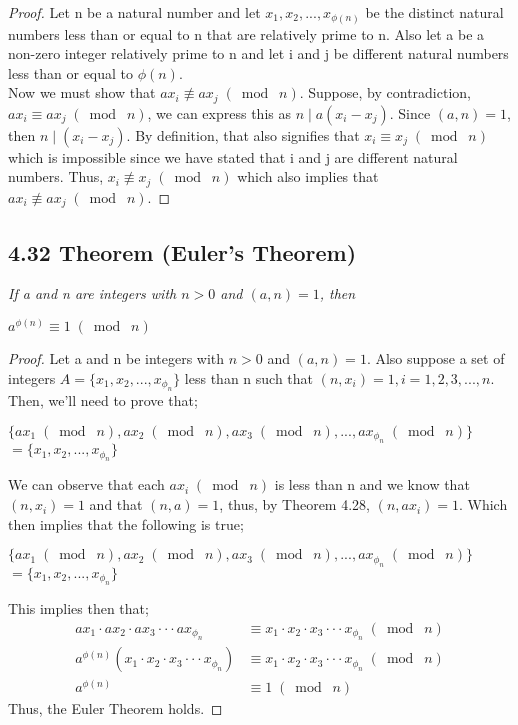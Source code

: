\documentclass{article}
\begin{document}
\begin{proof}
Let n be a natural number and let $x_1, x_2, ...,x_{\phi(n)}$ be the distinct natural numbers less than or equal to n that are relatively prime to n. Also let a be a non-zero integer relatively prime to n and let i and j be different natural numbers less than or equal to $\phi(n)$.\\
Now we must show that $ax_i \not\equiv ax_j \;(\bmod\; n)$. Suppose, by contradiction, $ax_i \equiv ax_j \;(\bmod\; n)$, we can express this as $n \mid a(x_i - x_j)$. Since $(a, n) = 1$, then $n \mid (x_i - x_j)$. By definition, that also signifies that $x_i \equiv x_j \;(\bmod\; n)$ which is impossible since we have stated that i and j are different natural numbers. Thus, $x_i \not\equiv x_j \;(\bmod\; n)$ which also implies that $ax_i \not\equiv ax_j \;(\bmod\; n)$.
\end{proof}

\subsection*{4.32 Theorem (Euler's Theorem)} 
\quad \textit{If a and n are integers with $n > 0$ and $(a, n) = 1$, then}
\begin{center}
    $a^{\phi(n)} \equiv 1 \;(\bmod\; n)$
\end{center}

\begin{proof}
Let a and n be integers with $n > 0$ and $(a,n) = 1$. Also suppose a set of integers $A = \{x_1, x_2,...,x_{\phi_n}\}$ less than n such that $(n, x_i) = 1, i = 1,2,3,...,n$.\\
Then, we'll need to prove that;
\begin{center}
    $\{ax_1 \;(\bmod\; n), ax_2 \;(\bmod\; n), ax_3 \;(\bmod\; n),..., ax_{\phi_n} \;(\bmod\; n)\}$\\
    $ = \{x_1, x_2,...,x_{\phi_n}\}$
\end{center}
We can observe that each $ax_i \;(\bmod\; n)$ is less than n and we know that $(n, x_i) = 1$ and that $(n, a) = 1$, thus, by Theorem 4.28, $(n, ax_i) = 1$. Which then implies that the following is true;
\begin{center}
    $\{ax_1 \;(\bmod\; n), ax_2 \;(\bmod\; n), ax_3 \;(\bmod\; n),..., ax_{\phi_n} \;(\bmod\; n)\}$\\
    $ = \{x_1, x_2,...,x_{\phi_n}\}$
\end{center}
This implies then that;
\begin{align*}
    &&ax_1 \cdot ax_2 \cdot ax_3 \cdot \cdot\cdot ax_{\phi_n} &\equiv x_1 \cdot x_2 \cdot x_3 \cdot \cdot\cdot x_{\phi_n} \;(\bmod\; n)&&\\
    &&a^{\phi(n)}(x_1 \cdot x_2 \cdot x_3 \cdot \cdot\cdot x_{\phi_n}) &\equiv x_1 \cdot x_2 \cdot x_3 \cdot \cdot\cdot x_{\phi_n} \;(\bmod\; n)&&\\
    &&a^{\phi(n)} &\equiv 1 \;(\bmod\; n)&&
\end{align*}
Thus, the Euler Theorem holds.
\end{proof}
\end{document}
